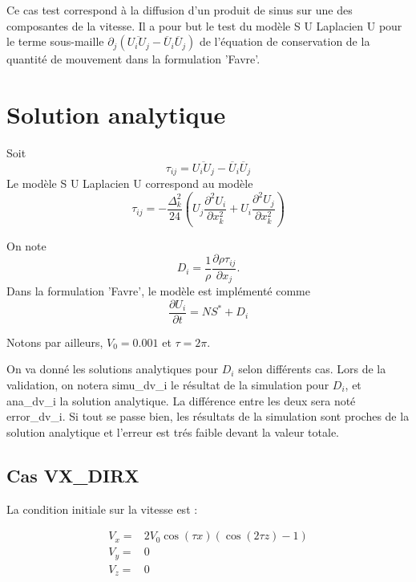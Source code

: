 Ce cas test correspond \`a la diffusion d'un produit de sinus sur une des composantes de la vitesse. Il a pour but le test du mod\`ele S U Laplacien U pour le terme sous-maille $\partial_j\left(\overline{U_i U_j} - \overline{U}_i\overline{U}_j\right)$ de l'\'equation de conservation de la quantit\'e de mouvement dans la formulation 'Favre'.

\section{Solution analytique}

Soit
\begin{equation}
\tau_{ij} = \overline{U_i U_j} - \overline{U}_i\overline{U}_j
\end{equation}
Le mod\`ele S U Laplacien U correspond au mod\`ele
\begin{equation}
\tau_{ij} = - \frac{\Delta_k^2}{24} \left(U_j \frac{\partial^2 U_i}{\partial x_k^2} + U_i \frac{\partial^2 U_j}{\partial x_k^2}\right)
\end{equation}

On note
\begin{equation}
D_i = \frac{1}{\rho} \frac{\partial \rho \tau_{ij}}{\partial x_j}.
\end{equation}
Dans la formulation 'Favre', le mod\`ele est impl\'ement\'e comme
\begin{equation}
\frac{\partial U_{i}}{\partial t} = NS^* + D_i
\end{equation}

Notons par ailleurs, $V_0 = 0.001$ et $\tau=2\pi$.

On va donn\'e les solutions analytiques pour $D_i$ selon diff\'erents cas.
Lors de la validation, on notera {\textsf simu\_dv\_i} le r\'esultat de la
simulation pour $D_i$, et {\textsf ana\_dv\_i} la solution analytique.
La diff\'erence entre les deux sera not\'e \textsf{error\_dv\_i}. Si tout se passe bien, les r\'esultats de la simulation sont proches de la solution analytique et l'erreur est tr\'es faible devant la valeur totale.



\subsection{Cas VX\_DIRX}

La condition initiale sur la vitesse est :

\begin{align*}
V_x ={}& 2 V_0 \cos(\tau x) (\cos(2 \tau z) - 1) \\
V_y ={}& 0 \\
V_z ={}& 0
\end{align*}

